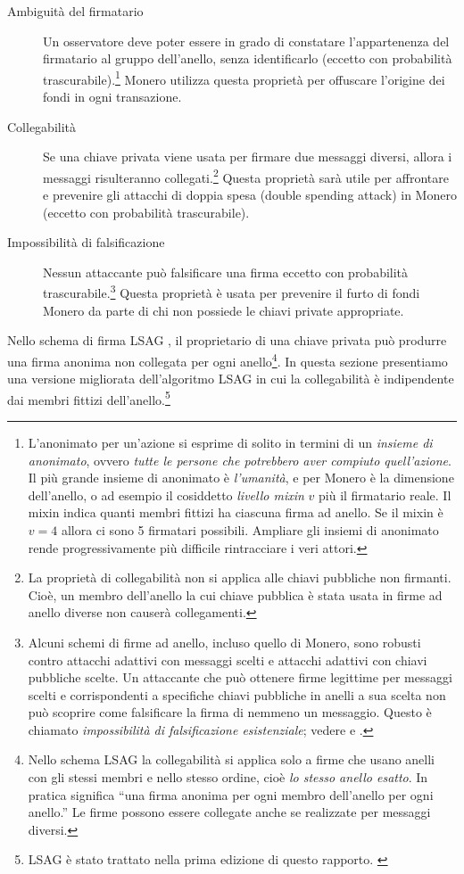 \begin{description}
	\item[Ambiguità del firmatario]
	Un osservatore deve poter essere in grado di constatare l'appartenenza del firmatario al gruppo dell’anello, senza identificarlo (eccetto con probabilità trascurabile).\footnote{\label{anonymity_note}L’anonimato per un’azione si esprime di solito in termini di un \emph{insieme di anonimato}, ovvero \emph{tutte le persone che potrebbero aver compiuto quell’azione}. Il più grande insieme di anonimato è \emph{l’umanità}, e per Monero è la dimensione dell’anello, o ad esempio il cosiddetto \emph{livello mixin} $v$ più il firmatario reale. Il mixin indica quanti membri fittizi ha ciascuna firma ad anello. Se il mixin è $v=4$ allora ci sono 5 firmatari possibili. Ampliare gli insiemi di anonimato rende progressivamente più difficile rintracciare i veri attori.} Monero utilizza questa proprietà per offuscare l’origine dei fondi in ogni transazione.

	\item[Collegabilità]
	Se una chiave privata viene usata per firmare due messaggi diversi, allora i messaggi risulteranno collegati.\footnote{\label{linkability_note}La proprietà di collegabilità non si applica alle chiavi pubbliche non firmanti. Cioè, un membro dell’anello la cui chiave pubblica è stata usata in firme ad anello diverse non causerà collegamenti.} Questa proprietà sarà utile per affrontare e prevenire gli attacchi di doppia spesa (double spending attack) in Monero (eccetto con probabilità trascurabile).

	\item[Impossibilità di falsificazione]
	Nessun attaccante può falsificare una firma eccetto con probabilità trascurabile.\footnote{\label{unforgeability_note}Alcuni schemi di firme ad anello, incluso quello di Monero, sono robusti contro attacchi adattivi con messaggi scelti e attacchi adattivi con chiavi pubbliche scelte. Un attaccante che può ottenere firme legittime per messaggi scelti e corrispondenti a specifiche chiavi pubbliche in anelli a sua scelta non può scoprire come falsificare la firma di nemmeno un messaggio. Questo è chiamato \emph{impossibilità di falsificazione esistenziale}; vedere \cite{MRL-0005-ringct} e \cite{Liu2004}.} Questa proprietà è usata per prevenire il furto di fondi Monero da parte di chi non possiede le chiavi private appropriate.
\end{description}

Nello schema di firma LSAG \cite{Liu2004}, il proprietario di una chiave privata può produrre una firma anonima non collegata per ogni anello\footnote{\label{lsag_linkability_note}Nello schema LSAG la collegabilità si applica solo a firme che usano anelli con gli stessi membri e nello stesso ordine, cioè \emph{lo stesso anello esatto}. In pratica significa ``una firma anonima per ogni membro dell’anello per ogni anello.” Le firme possono essere collegate anche se realizzate per messaggi diversi.}. In questa sezione presentiamo una versione migliorata dell’algoritmo LSAG in cui la collegabilità è indipendente dai membri fittizi dell’anello.\footnote{LSAG è stato trattato nella prima edizione di questo rapporto. \cite{ztm-1}}

